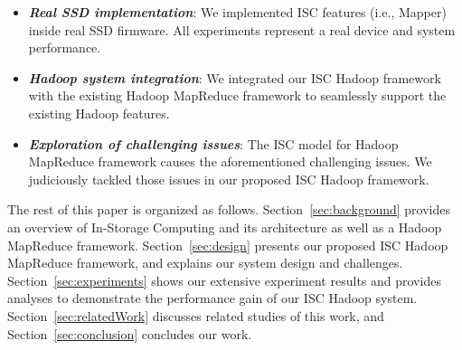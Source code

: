 

\begin{itemize}
  \item \emph{\textbf{Real SSD implementation}}: We implemented ISC features (i.e., Mapper) inside real SSD firmware. All experiments represent a real device and system performance.
  \item \emph{\textbf{Hadoop system integration}}: We integrated our ISC Hadoop framework with the existing Hadoop MapReduce framework to seamlessly support the existing Hadoop features.
	\item \emph{\textbf{Exploration of challenging issues}}: The ISC model for Hadoop MapReduce framework causes the aforementioned challenging issues. We judiciously tackled those issues in our proposed ISC Hadoop framework.
\end{itemize}





The rest of this paper is organized as follows.
Section~\ref{sec:background} provides an overview of In-Storage Computing and its architecture as well as a Hadoop MapReduce framework.
Section~\ref{sec:design} presents our proposed ISC Hadoop MapReduce framework, and explains our system design and challenges.
Section~\ref{sec:experiments} shows our extensive experiment results and provides analyses to demonstrate the performance gain of our ISC Hadoop system. Section~\ref{sec:relatedWork} discusses related studies of this work, and Section~\ref{sec:conclusion} concludes our work.


